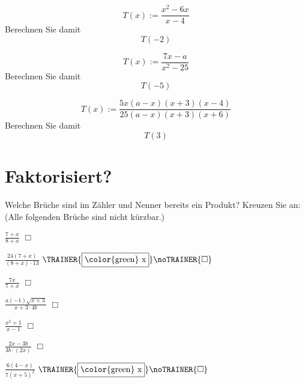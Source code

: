 {\nextBbwAufgabenNummer{}
\begin{bbwAufgabenBlock}
\item $$T(x) := \frac{x^2-6x}{x-4}$$
Berechnen Sie damit
$$T(-2)$$

\item $$T(x):=\frac{7x-a}{x^2-25}$$
Berechnen Sie damit
$$T(-5)$$

\item $$T(x):= \frac{5x(a-x)(x+3)(x-4)}{25(a-x)(x+3)(x+6)}$$
Berechnen Sie damit
$$T(3)$$
\end{bbwAufgabenBlock}

\newpage
\section{Faktorisiert?}

Welche Brüche sind im Zähler und Nenner bereits ein Produkt? Kreuzen Sie an:
(Alle folgenden Brüche sind nicht kürzbar.)

\newcommand{\BoxTT}{\TRAINER{\fbox{\color{green} x}}\noTRAINER{\Box}}

\begin{bbwAufgabenBlock}
\item $\frac{7+x}{8+x}$ $\Box{}$ 

\item $\frac{24(7+x)}{(8+x)\cdot{}13}$ $\BoxTT$ 

\item $\frac{7x}{7+x}$ $\Box{}$ 

\item $\frac{a(-1)\sqrt{x+3}}{x+3\cdot{}4b}$ $\Box{}$ 

\item $\frac{x^2+1}{x-1}$ $\Box{}$ 

\item $\frac{2x-3b}{3b\cdot{}(2x)}$ $\Box{}$ 

\item $\frac{6(4-x)}{7(x+5)^2}$ $\BoxTT$ 


\end{bbwAufgabenBlock}}
